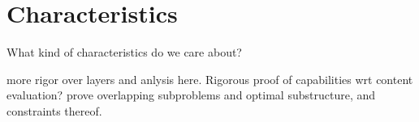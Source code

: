 \section{Characteristics}
\label{section:characteristics}
What kind of characteristics do we care about? 

more rigor over layers and anlysis here.  Rigorous proof of capabilities wrt content evaluation? prove overlapping subproblems and optimal substructure, and constraints thereof.